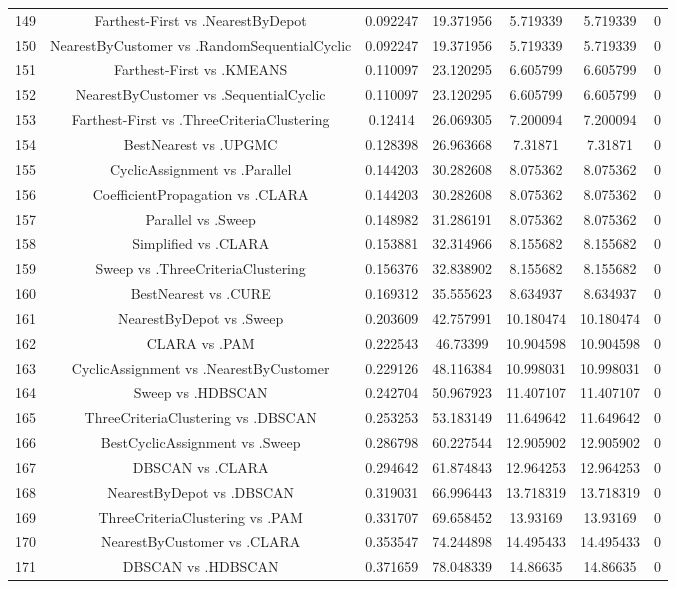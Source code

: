 \documentclass[a4paper,10pt]{article}
\begin{document}
\begin{landscape}
\begin{table}[!htp]
\begin{tabular}{ccccccc}
149&Farthest-First vs .NearestByDepot&0.092247&19.371956&5.719339&5.719339&0\\
150&NearestByCustomer vs .RandomSequentialCyclic&0.092247&19.371956&5.719339&5.719339&0\\
151&Farthest-First vs .KMEANS&0.110097&23.120295&6.605799&6.605799&0\\
152&NearestByCustomer vs .SequentialCyclic&0.110097&23.120295&6.605799&6.605799&0\\
153&Farthest-First vs .ThreeCriteriaClustering&0.12414&26.069305&7.200094&7.200094&0\\
154&BestNearest vs .UPGMC&0.128398&26.963668&7.31871&7.31871&0\\
155&CyclicAssignment vs .Parallel&0.144203&30.282608&8.075362&8.075362&0\\
156&CoefficientPropagation vs .CLARA&0.144203&30.282608&8.075362&8.075362&0\\
157&Parallel vs .Sweep&0.148982&31.286191&8.075362&8.075362&0\\
158&Simplified vs .CLARA&0.153881&32.314966&8.155682&8.155682&0\\
159&Sweep vs .ThreeCriteriaClustering&0.156376&32.838902&8.155682&8.155682&0\\
160&BestNearest vs .CURE&0.169312&35.555623&8.634937&8.634937&0\\
161&NearestByDepot vs .Sweep&0.203609&42.757991&10.180474&10.180474&0\\
162&CLARA vs .PAM&0.222543&46.73399&10.904598&10.904598&0\\
163&CyclicAssignment vs .NearestByCustomer&0.229126&48.116384&10.998031&10.998031&0\\
164&Sweep vs .HDBSCAN&0.242704&50.967923&11.407107&11.407107&0\\
165&ThreeCriteriaClustering vs .DBSCAN&0.253253&53.183149&11.649642&11.649642&0\\
166&BestCyclicAssignment vs .Sweep&0.286798&60.227544&12.905902&12.905902&0\\
167&DBSCAN vs .CLARA&0.294642&61.874843&12.964253&12.964253&0\\
168&NearestByDepot vs .DBSCAN&0.319031&66.996443&13.718319&13.718319&0\\
169&ThreeCriteriaClustering vs .PAM&0.331707&69.658452&13.93169&13.93169&0\\
170&NearestByCustomer vs .CLARA&0.353547&74.244898&14.495433&14.495433&0\\
171&DBSCAN vs .HDBSCAN&0.371659&78.048339&14.86635&14.86635&0\\

\end{tabular}
\end{table}
\end{landscape}
\end{document}
